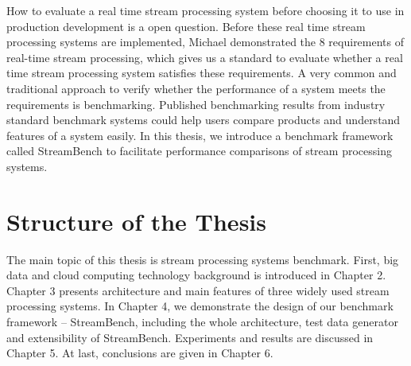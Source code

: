 How to evaluate a real time stream processing system before choosing it to use in production development is a open question.  Before these real time stream processing systems are implemented, Michael demonstrated the 8 requirements\cite{8requirements} of real-time stream processing, which gives us a standard to evaluate whether a real time stream processing system satisfies these requirements.  A very common and traditional approach to verify whether the performance of a system meets the requirements is benchmarking. Published benchmarking results from industry standard benchmark systems could help users compare products and understand features of a system easily. In this thesis, we introduce a benchmark framework called StreamBench to facilitate performance comparisons of stream processing systems. 

\section{Structure of the Thesis}
\label{section:structure} 
The main topic of this thesis is stream processing systems benchmark. First, big data and cloud computing technology background is introduced in Chapter 2. Chapter 3 presents architecture and main features of three widely used stream processing systems. In Chapter 4, we demonstrate the design of our benchmark framework -- StreamBench, including the whole architecture, test data generator and extensibility of StreamBench. Experiments and results are discussed in Chapter 5. At last, conclusions are given in Chapter 6.









\clearpage